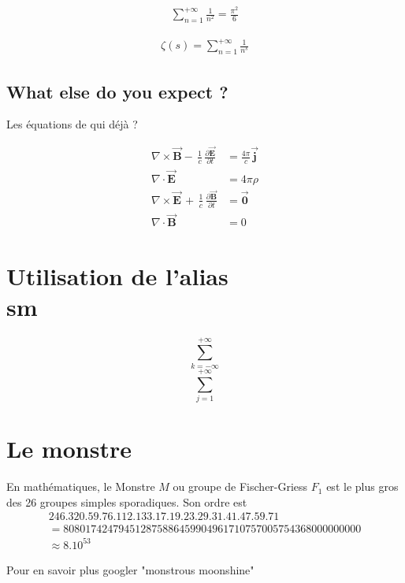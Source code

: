 \documentclass[twocolumn,a4paper]{IEEEtranfr}
\newcommand{\bear}{\begin{eqnarray}}
\newcommand{\ear}{\end{eqnarray}}
\newcommand{\sm}[1]{\sum_{#1=-\infty}^{+\infty}}
\newcommand{\smr}[3]{\sum_{#1=#2}^{#3}}
\newcommand{\smu}[1]{\sum_{#1=1}^{+\infty}}
\begin{document}
\bear
\smu{n} \frac{1}{n^2} =  \frac{\pi^2}{6}
\ear

\bear
\zeta(s)= \smu{n} \frac{1}{n^s}
\ear

\subsection{What else do you expect ? }

Les équations de qui déjà ?

\begin{equation}
\begin{aligned}
    \nabla \times \vec{\mathbf{B}} -\, \frac1c\,
    \frac{\partial\vec{\mathbf{E}}}{\partial t} & = \frac{4\pi}{c}\vec{\mathbf{j}} \\  
    \nabla \cdot \vec{\mathbf{E}} & = 4 \pi \rho \\
    \nabla \times \vec{\mathbf{E}}\, +\, \frac1c\,
    \frac{\partial\vec{\mathbf{B}}}{\partial t} & = \vec{\mathbf{0}} \\
    \nabla \cdot \vec{\mathbf{B}} & = 0
\end{aligned}
\end{equation}
\section{Utilisation de l'alias \\sm}
$$\sm{k}$$
$$\smr{j}{1}{+\infty}$$
\section{Le monstre}
En mathématiques, le Monstre $M$ ou groupe de Fischer-Griess $F_1$ est le plus gros des 26 groupes simples sporadiques. Son ordre est
\begin{eqnarray*}
246.320.59.76.112.133.17.19.23.29.31.41.47.59.71 \\
= 808 017 424 794 512 875 886 459 904 961 710 757 005 754 368 000 000 000 \\
\approx 8.10^{53}
\end{eqnarray*}

Pour en savoir plus googler "monstrous moonshine"
\end{document}
